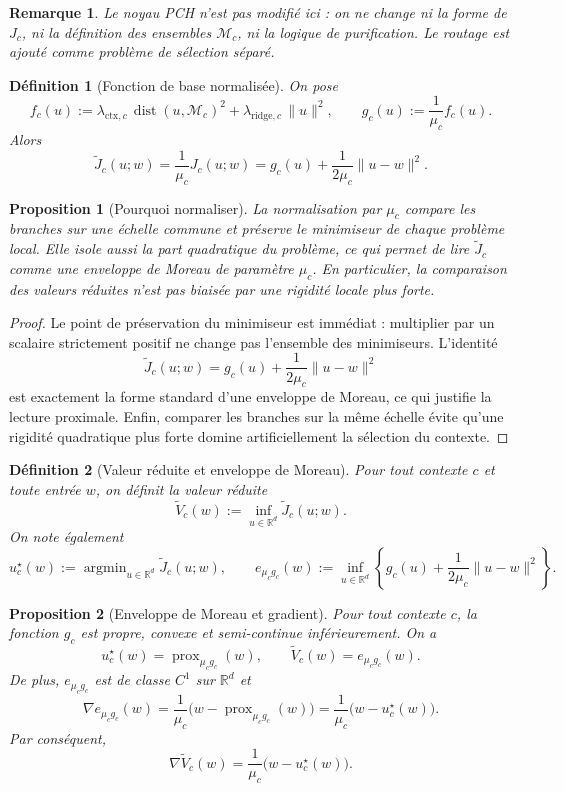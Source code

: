 \documentclass[11pt,a4paper]{article}
\newtheorem{definition}{Définition}[section]
\newtheorem{proposition}{Proposition}[section]
\newtheorem{remark}{Remarque}[section]
\DeclareMathOperator{\prox}{prox}
\DeclareMathOperator{\argmin}{argmin}
\DeclareMathOperator{\dist}{dist}
\newcommand{\R}{\mathbb R}
\newcommand{\Mcal}{\mathcal M}
\begin{document}
\begin{remark}
Le noyau PCH n'est pas modifié ici : on ne change ni la forme de \(J_c\), ni la définition des ensembles \(\Mcal_c\), ni la logique de purification. Le routage est ajouté comme problème de sélection séparé.
\end{remark}

\begin{definition}[Fonction de base normalisée]
On pose
\[
f_c(u):=\lambda_{\mathrm{ctx},c}\,\dist(u,\Mcal_c)^2+\lambda_{\mathrm{ridge},c}\,\|u\|^2,
\qquad
g_c(u):=\frac{1}{\mu_c}f_c(u).
\]
Alors
\[
\widetilde J_c(u;w)=\frac{1}{\mu_c}J_c(u;w)=g_c(u)+\frac{1}{2\mu_c}\|u-w\|^2.
\]
\end{definition}

\begin{proposition}[Pourquoi normaliser]
La normalisation par \(\mu_c\) compare les branches sur une échelle commune et préserve le minimiseur de chaque problème local. Elle isole aussi la part quadratique du problème, ce qui permet de lire \(\widetilde J_c\) comme une enveloppe de Moreau de paramètre \(\mu_c\). En particulier, la comparaison des valeurs réduites n'est pas biaisée par une rigidité locale plus forte.
\end{proposition}

\begin{proof}
Le point de préservation du minimiseur est immédiat : multiplier par un scalaire strictement positif ne change pas l'ensemble des minimiseurs. L'identité
\[
\widetilde J_c(u;w)=g_c(u)+\frac{1}{2\mu_c}\|u-w\|^2
\]
est exactement la forme standard d'une enveloppe de Moreau, ce qui justifie la lecture proximale. Enfin, comparer les branches sur la même échelle évite qu'une rigidité quadratique plus forte domine artificiellement la sélection du contexte.
\end{proof}

\begin{definition}[Valeur réduite et enveloppe de Moreau]
Pour tout contexte \(c\) et toute entrée \(w\), on définit la valeur réduite
\[
\widetilde V_c(w):=\inf_{u\in\R^d}\widetilde J_c(u;w).
\]
On note également
\[
u_c^\star(w):=\argmin_{u\in\R^d}\widetilde J_c(u;w),
\qquad
e_{\mu_c g_c}(w):=\inf_{u\in\R^d}\left\{g_c(u)+\frac{1}{2\mu_c}\|u-w\|^2\right\}.
\]
\end{definition}

\begin{proposition}[Enveloppe de Moreau et gradient]
Pour tout contexte \(c\), la fonction \(g_c\) est propre, convexe et semi-continue inférieurement. On a
\[
u_c^\star(w)=\prox_{\mu_c g_c}(w),
\qquad
\widetilde V_c(w)=e_{\mu_c g_c}(w).
\]
De plus, \(e_{\mu_c g_c}\) est de classe \(C^1\) sur \(\R^d\) et
\[
\nabla e_{\mu_c g_c}(w)=\frac{1}{\mu_c}\bigl(w-\prox_{\mu_c g_c}(w)\bigr)
=\frac{1}{\mu_c}\bigl(w-u_c^\star(w)\bigr).
\]
Par conséquent,
\[
\nabla \widetilde V_c(w)=\frac{1}{\mu_c}\bigl(w-u_c^\star(w)\bigr).
\]
\end{proposition}
\end{document}
